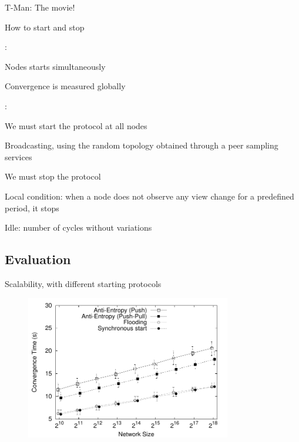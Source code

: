 \begin{frame}{T-Man: The movie!}
	

\begin{figure}
\end{figure}


\end{frame}


\begin{frame}{How to start and stop}
	
:\\
\BIL
\item Nodes starts simultaneously
\item Convergence is measured globally
\EIL

\bigskip
{}:\\
\BIL
\item We must start the protocol at all nodes
\BI
\item Broadcasting, using the random topology obtained through a peer sampling services
\EI
\item We must stop the protocol
\BI
\item Local condition: when a node does not observe any view change for a predefined period, it stops
\item Idle: number of cycles without variations
\EI
\EIL

\end{frame}

\subsection{Evaluation}

\begin{frame}{Scalability, with different starting protocols}
	
\begin{figure}
	\includegraphics[width=0.80\textwidth]{figs/11/sort-size-ctime}
\end{figure}	
	
\end{frame}

